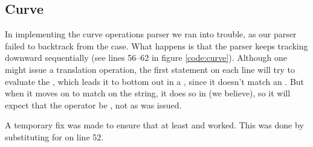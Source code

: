 \subsection{Curve}
In implementing the curve operations parser we ran into trouble, as our parser
failed to backtrack from the  case. What happens is that the parser
keeps tracking downward sequentially (see lines 56--62 in figure
\ref{code:curve}). Although one might issue a translation operation, the first
statement on each line will try to evaluate the , which leads it to
bottom out in a , since it doesn't match an . But when
it moves on to match on the string, it does so in  (we believe), so
it will expect that the operator be , not \code{->} as was issued.


A temporary fix was made to ensure that at least  and
 worked. This was done by substituting  for  on
line 52.
